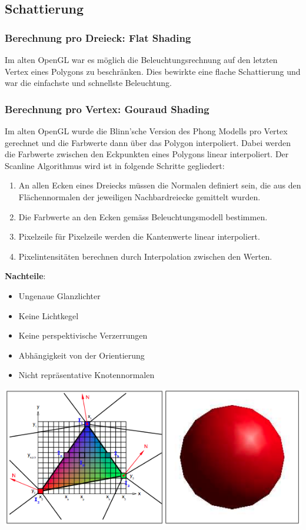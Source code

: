 \documentclass[10pt]{article}
\begin{document}
\subsection{Schattierung}
\subsubsection{Berechnung pro Dreieck: Flat Shading}
Im alten OpenGL war es möglich die Beleuchtungsrechnung auf den letzten Vertex eines Polygons zu beschränken. Dies bewirkte eine flache Schattierung und war die einfachste und schnellste Beleuchtung.
\subsubsection{Berechnung pro Vertex: Gouraud Shading}
Im alten OpenGL wurde die Blinn'sche Version des Phong Modells pro Vertex gerechnet und die Farbwerte dann über das Polygon interpoliert. Dabei werden die Farbwerte zwischen den Eckpunkten eines Polygons linear interpoliert. Der Scanline Algorithmus wird ist in folgende Schritte gegliedert:
\begin{enumerate}
	\item An allen Ecken eines Dreiecks müssen die Normalen definiert sein, die aus den Flächennormalen der jeweiligen Nachbardreiecke gemittelt wurden.
	\item Die Farbwerte an den Ecken gemäss Beleuchtungsmodell bestimmen.
	\item Pixelzeile für Pixelzeile werden die Kantenwerte linear interpoliert.
	\item Pixelintensitäten berechnen durch Interpolation zwischen den Werten.
\end{enumerate}
\textbf{Nachteile}:
\begin{itemize}
	\item  Ungenaue Glanzlichter
	\item Keine Lichtkegel
	\item Keine perspektivische Verzerrungen
	\item Abhängigkeit von der Orientierung
	\item Nicht repräsentative Knotennormalen
\end{itemize}
\begin{center}
	\includegraphics[scale=0.4]{gouraud_shading.png}
\end{center}
\end{document}

